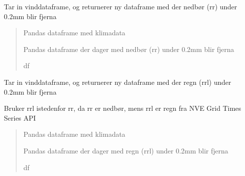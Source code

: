 \documentclass[letterpaper,10pt,norsk]{sphinxmanual}
\begin{document}
\begin{fulllineitems}
\label{\detokenize{index:klimadata.klimadata.vind_nedbor}}
\pysigstartsignatures
{}
\pysigstopsignatures
\sphinxAtStartPar
Tar in vinddataframe, og returnerer ny dataframe med der nedbør (rr) under 0.2mm blir fjerna
\begin{quote}\begin{description}
\sphinxAtStartPar
{} \textendash{} Pandas dataframe med klimadata

\sphinxAtStartPar
Pandas dataframe der dager med nedbør (rr) under 0.2mm blir fjerna

\sphinxAtStartPar
df

\end{description}\end{quote}

\end{fulllineitems}


\begin{fulllineitems}
\label{\detokenize{index:klimadata.klimadata.vind_regn}}
\pysigstartsignatures
{}
\pysigstopsignatures
\sphinxAtStartPar
Tar in vinddataframe, og returnerer ny dataframe med der regn (rrl) under 0.2mm blir fjerna

\sphinxAtStartPar
Bruker rrl istedenfor rr, da rr er nedbør, mens rrl er regn fra NVE Grid Times Series API
\begin{quote}\begin{description}
\sphinxAtStartPar
{} \textendash{} Pandas dataframe med klimadata

\sphinxAtStartPar
Pandas dataframe der dager med regn (rrl) under 0.2mm blir fjerna

\sphinxAtStartPar
df

\end{description}\end{quote}

\end{fulllineitems}
\end{document}
